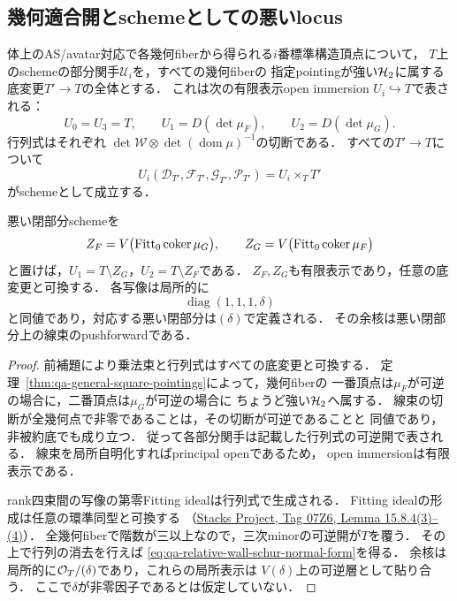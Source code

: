 \subsection{幾何適合開とschemeとしての悪いlocus}

\begin{theorem}[標準構造頂点の有限表示開部分関手]
\label{thm:qa-relative-vertex-determinant-open}
体上のAS/avatar対応で各幾何fiberから得られる$i$番標準構造頂点について，
$T$上のschemeの部分関手$\mathscr U_i$を，すべての幾何fiberの
指定pointingが強い$\mathcal H_2$に属する底変更$T'\to T$の全体とする．
これは次の有限表示open immersion $U_i\hookrightarrow T$で表される：
\begin{equation}
 U_0=U_3=T,\qquad
 U_1=D(\det\mu_F),\qquad U_2=D(\det\mu_G).
 \label{eq:qa-relative-square-vertex-open}
\end{equation}
行列式はそれぞれ
$\det\mathcal W\otimes\det(\operatorname{dom}\mu)^{-1}$の切断である．
すべての$T'\to T$について
\[
 U_i(\mathcal D_{T'},\mathcal F_{T'},\mathcal G_{T'},\mathcal P_{T'})
 =U_i\times_T T'
\]
がschemeとして成立する．

悪い閉部分schemeを
\[
 Z_F=V\bigl(\operatorname{Fitt}_0\operatorname{coker}\mu_G\bigr),\qquad
 Z_G=V\bigl(\operatorname{Fitt}_0\operatorname{coker}\mu_F\bigr)
\]
と置けば，$U_1=T\setminus Z_G$，$U_2=T\setminus Z_F$である．
$Z_F,Z_G$も有限表示であり，任意の底変更と可換する．
各写像は局所的に
\begin{equation}
 \operatorname{diag}(1,1,1,\delta)
 \label{eq:qa-relative-wall-schur-normal-form}
\end{equation}
と同値であり，対応する悪い閉部分は$(\delta)$で定義される．
その余核は悪い閉部分上の線束のpushforwardである．
\end{theorem}
\begin{proof}
前補題により乗法束と行列式はすべての底変更と可換する．
定理~\ref{thm:qa-general-square-pointings}によって，幾何fiberの
一番頂点は$\mu_F$が可逆の場合に，二番頂点は$\mu_G$が可逆の場合に
ちょうど強い$\mathcal H_2$へ属する．
線束の切断が全幾何点で非零であることは，その切断が可逆であることと
同値であり，非被約底でも成り立つ．
従って各部分関手は記載した行列式の可逆開で表される．
線束を局所自明化すればprincipal openであるため，
open immersionは有限表示である．

rank四束間の写像の第零Fitting idealは行列式で生成される．
Fitting idealの形成は任意の環準同型と可換する
（\href{https://stacks.math.columbia.edu/tag/07Z6}
{Stacks Project, Tag 07Z6, Lemma 15.8.4(3)--(4)}）．
全幾何fiberで階数が三以上なので，三次minorの可逆開が$T$を覆う．
その上で行列の消去を行えば
\eqref{eq:qa-relative-wall-schur-normal-form}を得る．
余核は局所的に$\mathcal O_T/(\delta)$であり，これらの局所表示は
$V(\delta)$上の可逆層として貼り合う．
ここで$\delta$が非零因子であるとは仮定していない．
\end{proof}

